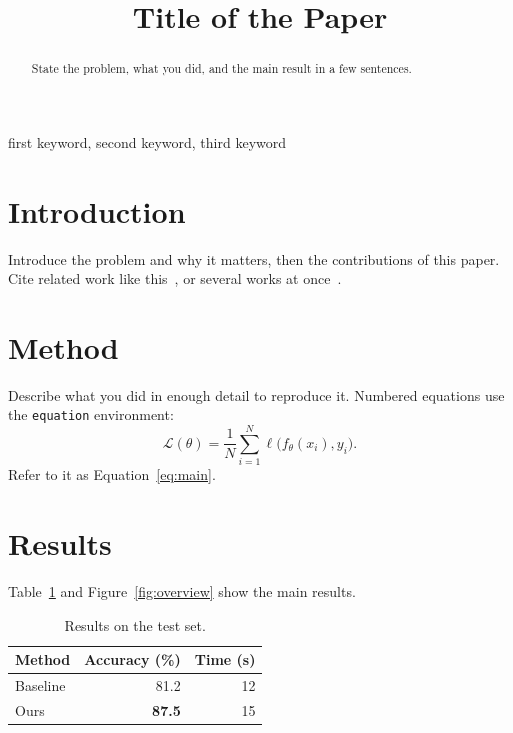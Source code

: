 \documentclass[lineno]{asmeconf}
\title{Title of the Paper}
\begin{document}
\maketitle

\begin{abstract}
State the problem, what you did, and the main result in a few sentences.
\end{abstract}

\begin{keywords}
first keyword, second keyword, third keyword
\end{keywords}

\section{Introduction}
\label{sec:intro}
Introduce the problem and why it matters, then the contributions of this
paper. Cite related work like this~\cite{zienkiewicz2005}, or several works at
once~\cite{zienkiewicz2005,timoshenko1959}.

\section{Method}
\label{sec:method}
Describe what you did in enough detail to reproduce it. Numbered equations use
the \texttt{equation} environment:
\begin{equation}
  \label{eq:main}
  \mathcal{L}(\theta) = \frac{1}{N} \sum_{i=1}^{N} \ell\bigl(f_\theta(x_i), y_i\bigr).
\end{equation}
Refer to it as Equation~\eqref{eq:main}.

\section{Results}
\label{sec:results}
Table~\ref{tab:results} and Figure~\ref{fig:overview} show the main results.

\begin{table}[htbp]
  \centering
  \caption{Results on the test set.}
  \label{tab:results}
  \begin{tabular}{lrr}
    \toprule
    Method & Accuracy (\%) & Time (s) \\
    \midrule
    Baseline & 81.2 & 12 \\
    Ours & \textbf{87.5} & 15 \\
    \bottomrule
  \end{tabular}
\end{table}
\end{document}

